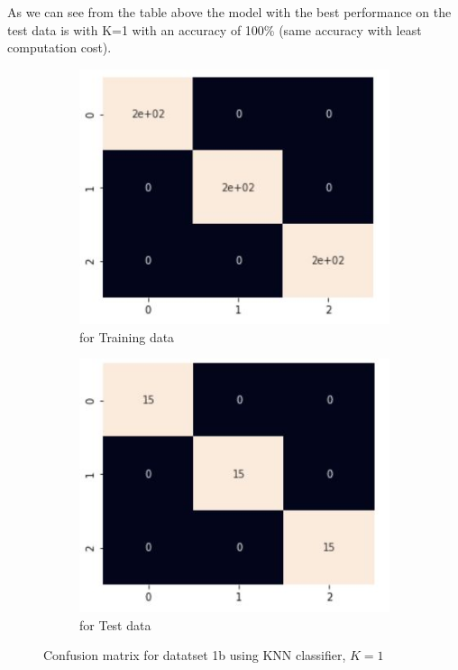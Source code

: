 \documentclass[11pt]{article}
\begin{document}
As we can see from the table above the model with the best performance on the test data is with  K=1 with an accuracy of 100\% (same accuracy with least computation cost).
\begin{figure}[h]
\centering
	\begin{subfigure}[b]{0.45\textwidth}
	\centering
	\includegraphics[scale=0.6]{dataset1b_knn_hm_train.jpg}
	\caption{for Training data}
	\label{fig:fig2.2.3.1}
	\end{subfigure}
	\hfill
	\begin{subfigure}[b]{0.45\textwidth}
	\centering
	\includegraphics[scale=0.6]{dataset1b_knn_hm_test.jpg}
	\caption{for Test data}
	\label{fig:fig2.2.3.2}
	\end{subfigure}
\caption{Confusion matrix for datatset 1b using KNN classifier,  $K=1$}
\label{fig:fig1.2.1}
\end{figure}
\end{document}

